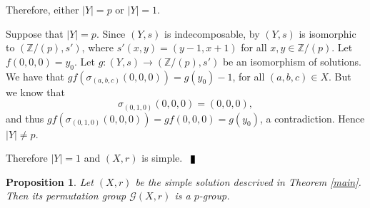 \documentclass[10pt]{article}
\newtheorem{proposition}[theorem]{Proposition}
\newcommand{\Z}{\mathbb{Z}}
\newenvironment{proof}{\par\noindent{ Proof.}}{$\qed$\par\bigskip}
\newcommand{\qed}{\enspace\vrule  height6pt  width4pt  depth2pt}
\begin{document}
\begin{proof}
Therefore, either $|Y|=p$ or $|Y|=1$.

Suppose that $|Y|=p$. Since $(Y,s)$ is indecomposable, by
\cite[Theorem 2.13]{ESS} $(Y,s)$ is isomorphic to $(\Z/(p),s')$,
where $s'(x,y)=(y-1,x+1)$ for all $x,y\in\Z/(p)$. Let
$f(0,0,0)=y_0$. Let $g\colon (Y,s)\longrightarrow (\Z/(p),s')$ be
an isomorphism of solutions. We have that
$gf(\sigma_{(a,b,c)}(0,0,0))= g(y_0)-1$, for all $(a,b,c)\in X$.
But we know that
$$\sigma_{(0,1,0)}(0,0,0)=(0,0,0),$$
and thus $gf(\sigma_{(0,1,0)}(0,0,0))=gf(0,0,0)=g(y_0)$, a
contradiction. Hence $|Y|\neq p$.

Therefore $|Y|=1$ and $(X,r)$ is simple.
\end{proof}

\begin{proposition}
	Let $(X,r)$ be the simple solution descrived in Theorem \ref{main}. Then its permutation group $\mathcal{G}(X,r)$ is a $p$-group.
\end{proposition}
\end{document}
